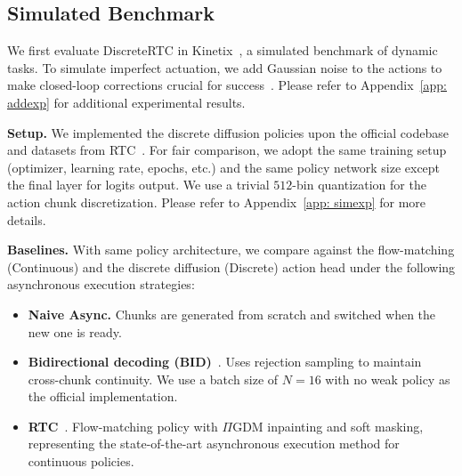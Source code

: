 \documentclass{article}
\begin{document}
\subsection{Simulated Benchmark}
\label{sec:exp_sim}

We first evaluate DiscreteRTC in Kinetix~\citep{matthews2024kinetix}, a simulated benchmark of dynamic tasks.
To simulate imperfect actuation, we add Gaussian noise to the actions to make closed-loop corrections crucial for success~\citep{wang2026real}. Please refer to Appendix~\ref{app: addexp} for additional experimental results.

\textbf{Setup.}
We implemented the discrete diffusion policies upon the official codebase and datasets from RTC~\citep{black2025real}.
For fair comparison, we adopt the same training setup (optimizer, learning rate, epochs, etc.) and the same policy network size except the final layer for logits output.
We use a trivial $512$-bin quantization for the action chunk discretization.
Please refer to Appendix~\ref{app: simexp} for more details.

\textbf{Baselines.} With same policy architecture, we compare against the flow-matching (Continuous) and the discrete diffusion (Discrete) action head under the following asynchronous execution strategies:
\begin{itemize}

    \item \textbf{Naive Async.} Chunks are generated from scratch and switched when the new one is ready.
    \item \textbf{Bidirectional decoding (BID)}~\citep{liu2024bidirectional}. Uses rejection sampling to maintain cross-chunk continuity. We use a batch size of $N = 16$ with no weak policy as the official implementation.
    \item \textbf{RTC}~\citep{black2025real}. Flow-matching policy with $\Pi$GDM inpainting and soft masking, representing the state-of-the-art asynchronous execution method for continuous policies.
\end{itemize}
\end{document}
